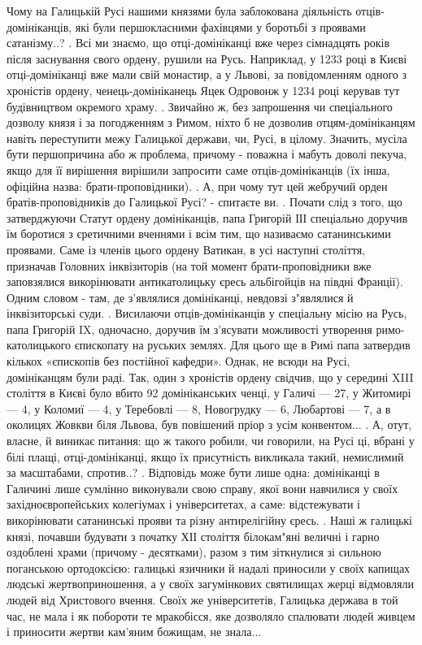 Чому на Галицькій Русі нашими князями була заблокована діяльність отців-домініканців, які були першокласними фахівцями у боротьбі з проявами сатанізму..?
.
Всі ми знаємо, що отці-домініканці вже через сімнадцять років після заснування свого ордену, рушили на Русь. Наприклад, у 1233 році в Києві отці-домініканці вже мали свій монастир, а у Львові, за повідомленням одного з хроністів ордену, ченець-домініканець Яцек Одровонж у 1234 році керував тут  будівництвом окремого храму.
.
Звичайно ж, без запрошення чи спеціального дозволу князя і за погодженням з Римом, ніхто б не дозволив отцям-домініканцям навіть переступити межу Галицької держави, чи, Русі, в цілому. Значить, мусіла бути першопричина або ж проблема, причому - поважна і мабуть доволі пекуча, якщо для її вирішення вирішили запросити саме отців-домініканців (їх інша, офіційна назва: брати-проповідники).
.
А, при чому тут цей жебручий орден братів-проповідників  до Галицької Русі? - спитаєте ви. 
.
Почати слід з того, що затверджуючи Статут ордену домініканців, папа Григорій ІІІ спеціально доручив їм боротися з єретичними вченнями і всім тим, що називаємо сатанинськими проявами. Саме із членів цього ордену Ватикан, в усі наступні століття, призначав Головних інквізиторів (на той момент брати-проповідники вже заповзялися викорінювати антикатолицьку єресь альбігойців на півдні Франції). Одним словом - там, де з'являлися домініканці, невдовзі з"являлися й інквізиторські суди.
.
Висилаючи отців-домініканців у спеціальну місію на Русь, папа Григорій IX, одночасно, доручив їм з’ясувати можливості утворення римо-католицького єпископату на руських землях. Для цього ще в Римі папа затвердив кількох «єпископів без постійної кафедри». Однак, не всюди на Русі, домініканцям були раді. Так, один з хроністів ордену свідчив, що у середині XIII століття в Києві було вбито 92 домініканських ченці, у Галичі — 27, у Житомирі — 4, у Коломиї — 4, у Теребовлі — 8, Новогрудку — 6, Любартові — 7, а в околицях Жовкви біля Львова, був повішений пріор з усім конвентом...
.
А, отут, власне, й виникає питання: що ж такого робили, чи говорили, на Русі ці, вбрані у білі плащі, отці-домініканці, якщо їх присутність викликала такий, немислимий за масштабами, спротив..?
.
Відповідь може бути лише одна: домініканці в Галичині лише сумлінно виконували свою справу, якої вони навчилися у своїх західноєвропейських колегіумах і університетах, а саме: відстежувати і викорінювати сатанинські прояви та різну антирелігійну єресь.
.
Наші ж галицькі князі, почавши будувати з початку ХІІ століття  білокам"яні величні і гарно оздоблені храми (причому - десятками), разом з тим зіткнулися зі сильною поганською ортодоксією: галицькі язичники й надалі приносили у своїх капищах людські жертвоприношення, а у своїх загумінкових святилищах жерці відмовляли людей від Христового вчення. Своїх же університетів, Галицька держава в той час, не мала і як побороти те мракобісся, яке дозволяло спалювати людей живцем і приносити жертви кам'яним божищам, не знала...

